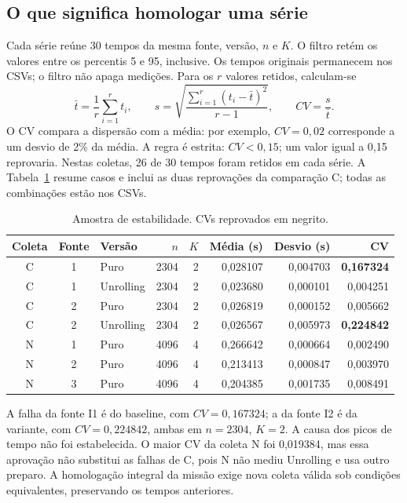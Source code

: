 \documentclass[11pt,a4paper]{article}
\begin{document}
\subsection{O que significa homologar uma série}
Cada série reúne 30 tempos da mesma fonte, versão, $n$ e $K$.
O filtro retém os valores entre os percentis 5 e 95, inclusive. Os tempos
originais permanecem nos CSVs; o filtro não apaga medições.
Para os $r$ valores retidos, calculam-se
\[
 \bar t=\frac{1}{r}\sum_{i=1}^{r}t_i,\qquad
 s=\sqrt{\frac{\sum_{i=1}^{r}(t_i-\bar t)^2}{r-1}},\qquad
 CV=\frac{s}{\bar t}.
\]
O CV compara a dispersão com a média: por exemplo, $CV=0{,}02$ corresponde
a um desvio de 2\% da média. A regra é estrita: $CV<0{,}15$;
um valor igual a 0,15 reprovaria. Nestas coletas, 26 de 30 tempos foram
retidos em cada série. A Tabela~\ref{tab:cv} resume casos e inclui as duas
reprovações da comparação C; todas as combinações estão nos CSVs.
\begin{table}[htbp]\centering\footnotesize
\caption{Amostra de estabilidade. CVs reprovados em negrito.}
\label{tab:cv}
\begin{tabular}{@{}cclrrrrr@{}}\toprule
Coleta & Fonte & Versão & $n$ & $K$ & Média (s) & Desvio (s) & CV\\\midrule
C & 1 & Puro & 2304 & 2 & 0,028107 & 0,004703 & \textbf{0,167324} \\
C & 1 & Unrolling & 2304 & 2 & 0,023680 & 0,000101 & 0,004251 \\
C & 2 & Puro & 2304 & 2 & 0,026819 & 0,000152 & 0,005662 \\
C & 2 & Unrolling & 2304 & 2 & 0,026567 & 0,005973 & \textbf{0,224842} \\
N & 1 & Puro & 4096 & 4 & 0,266642 & 0,000664 & 0,002490 \\
N & 2 & Puro & 4096 & 4 & 0,213413 & 0,000847 & 0,003970 \\
N & 3 & Puro & 4096 & 4 & 0,204385 & 0,001735 & 0,008491 \\
\bottomrule\end{tabular}
\end{table}

A falha da fonte I1 é do baseline, com $CV=0{,}167324$; a da fonte I2 é da
variante, com $CV=0{,}224842$, ambas em $n=2304$, $K=2$.
A causa dos picos de tempo não foi estabelecida. O maior CV da coleta N foi
0,019384, mas essa aprovação não substitui as falhas de C, pois N não mediu
Unrolling e usa outro preparo. A homologação integral da missão exige nova
coleta válida sob condições equivalentes, preservando os tempos anteriores.
\end{document}
